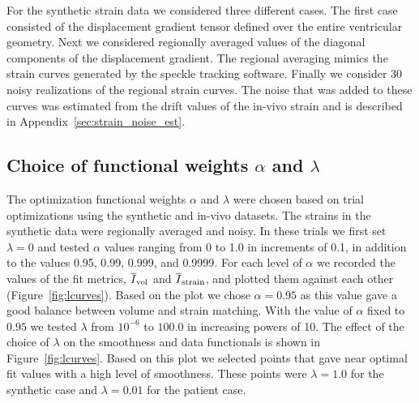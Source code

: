 For the synthetic strain data we considered three different cases. The
first case consisted of the displacement  
gradient tensor defined over the entire ventricular geometry. Next we
considered regionally averaged values of the 
diagonal components of the displacement gradient. The regional averaging mimics the
strain curves generated by the speckle tracking software.  
Finally we consider 30 noisy realizations of the regional strain
curves. The noise that was added to these curves was estimated 
from the drift values of the in-vivo strain and is described in
Appendix~\ref{sec:strain_noise_est}.


\subsection{Choice of functional weights $\alpha$ and $\lambda$}
\label{sec:a_l_choice}
The optimization functional weights $\alpha$ and $\lambda$ were chosen based on
trial optimizations using the synthetic and in-vivo datasets. The strains in the synthetic
data were regionally averaged and noisy.
In these trials we first set $\lambda = 0$ and tested $\alpha$ values
ranging from 0 to 1.0 in increments of 0.1, in addition to the values
0.95, 0.99, 0.999, and 0.9999.
For each level of $\alpha$ we recorded the values of the
fit metrics, $\overline{I}_{\text{vol}}$ 
and $\overline{I}_{\text{strain}}$, and plotted them against each
other (Figure~\ref{fig:lcurves}). Based on the plot 
we chose $\alpha = 0.95$ as this value gave a good balance between
volume and strain matching.  
With the value of $\alpha$ fixed to $0.95$ we tested $\lambda$
from $10^{-6}$ to $100.0$ in increasing powers of 10.
The effect of the choice of $\lambda$ on the smoothness and data functionals
is shown in Figure~\ref{fig:lcurves}. Based on this plot we selected points
that gave near optimal fit values with a high level of smoothness. 
These points were $\lambda = 1.0$ for the synthetic case
and $\lambda = 0.01$ for the patient case.



